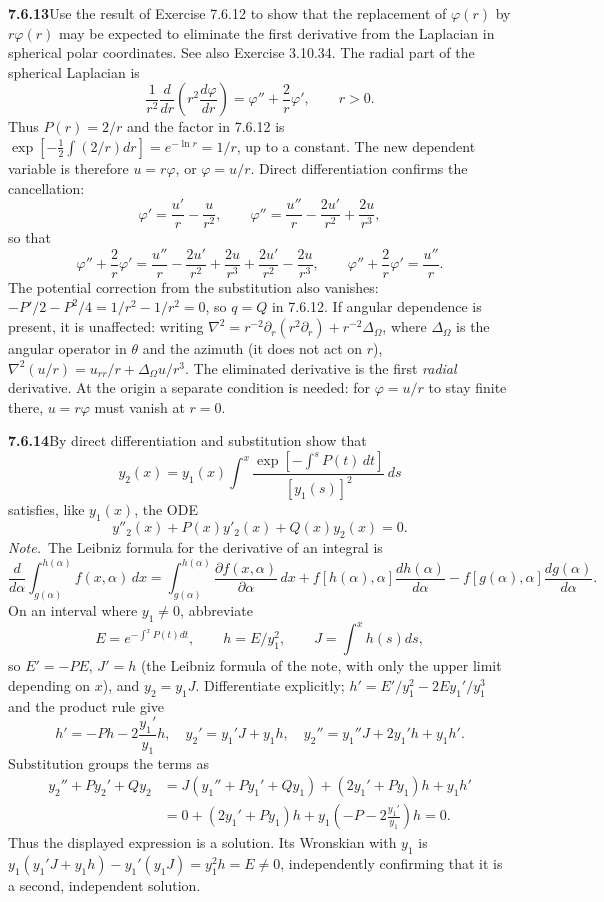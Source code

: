 \par\bigskip
\noindent\textbf{7.6.13}\quad Use the result of Exercise 7.6.12 to show that
the replacement of $\varphi(r)$ by $r\varphi(r)$ may be expected to eliminate
the first derivative from the Laplacian in spherical polar coordinates. See
also Exercise 3.10.34.
\solution
The radial part of the spherical Laplacian is
\[
\frac1{r^2}\frac d{dr}\left(r^2\frac{d\varphi}{dr}\right)
=\varphi''+\frac2r\varphi',\qquad r>0.
\]
Thus $P(r)=2/r$ and the factor in 7.6.12 is
$\exp[-\tfrac12\int(2/r)dr]=e^{-\ln r}=1/r$, up to a constant.
The new dependent variable is therefore $u=r\varphi$, or
$\varphi=u/r$. Direct differentiation confirms the cancellation:
\[
\varphi'=\frac{u'}r-\frac u{r^2},\qquad
\varphi''=\frac{u''}r-\frac{2u'}{r^2}+\frac{2u}{r^3},
\]
so that
\[
\varphi''+\frac2r\varphi'
=\frac{u''}r-\frac{2u'}{r^2}+\frac{2u}{r^3}+\frac{2u'}{r^2}-\frac{2u}{r^3},
\qquad
\boxed{\varphi''+\frac2r\varphi'=\frac{u''}r}.
\]
The potential correction from the substitution also vanishes:
$-P'/2-P^2/4=1/r^2-1/r^2=0$, so $q=Q$ in 7.6.12.
If angular dependence is present, it is unaffected: writing
$\nabla^2=r^{-2}\partial_r(r^2\partial_r)+r^{-2}\Delta_\Omega$, where
$\Delta_\Omega$ is the angular operator in $\theta$ and the azimuth
(it does not act on $r$),
$\nabla^2(u/r)=u_{rr}/r+\Delta_\Omega u/r^3$.
The eliminated derivative is the first \emph{radial} derivative. At the
origin a separate condition is needed: for $\varphi=u/r$ to stay finite
there, $u=r\varphi$ must vanish at $r=0$.

\par\bigskip
\noindent\textbf{7.6.14}\quad By direct differentiation and substitution show
that
\[
y_{2}(x)=y_{1}(x)\int^{x}\frac{\exp\left[-\int^{s}P(t)\,dt\right]}
{[y_{1}(s)]^{2}}\,ds
\]
satisfies, like $y_{1}(x)$, the ODE
\[
y''_{2}(x)+P(x)y'_{2}(x)+Q(x)y_{2}(x)=0.
\]
\emph{Note.}~The Leibniz formula for the derivative of an integral is
\[
\frac{d}{d\alpha}\int_{g(\alpha)}^{h(\alpha)}f(x,\alpha)\,dx
=\int_{g(\alpha)}^{h(\alpha)}\frac{\partial f(x,\alpha)}{\partial\alpha}\,dx
+f[h(\alpha),\alpha]\frac{dh(\alpha)}{d\alpha}
-f[g(\alpha),\alpha]\frac{dg(\alpha)}{d\alpha}.
\]
\solution
On an interval where $y_1\ne0$, abbreviate
\[
E=e^{-\int^xP(t)dt},\qquad h=E/y_1^2,\qquad
J=\int^xh(s)ds,
\]
so $E'=-PE$, $J'=h$ (the Leibniz formula of the note, with only the
upper limit depending on $x$), and $y_2=y_1J$. Differentiate
explicitly; $h'=E'/y_1^2-2Ey_1'/y_1^3$ and the product rule give
\[
h'=-Ph-2\frac{y_1'}{y_1}h,
\quad y_2'=y_1'J+y_1h,
\quad y_2''=y_1''J+2y_1'h+y_1h'.
\]
Substitution groups the terms as
\begin{align*}
y_2''+Py_2'+Qy_2
&=J(y_1''+Py_1'+Qy_1)+(2y_1'+Py_1)h+y_1h'\\
&=0+(2y_1'+Py_1)h
  +y_1\left(-P-2\frac{y_1'}{y_1}\right)h=0.
\end{align*}
Thus the displayed expression is a solution. Its Wronskian with $y_1$
is $y_1(y_1'J+y_1h)-y_1'(y_1J)=y_1^2h=E\ne0$, independently
confirming that it is a second, independent solution.


